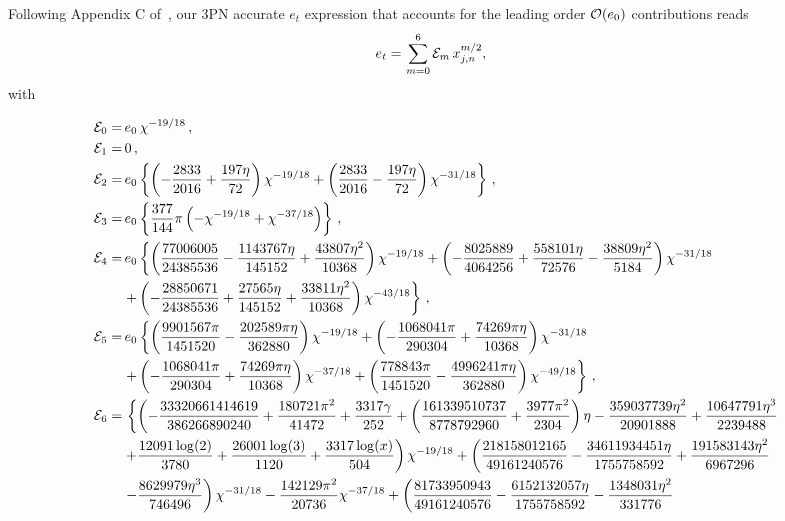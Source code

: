 \documentclass[aps,prd,twocolumn,superscriptaddress,groupedaddress,nofootinbib,showpacs,eqsecnum,useAms]{revtex4-2}
\begin{document}
Following Appendix C of~\cite{TGHH}, our 3PN accurate $e_t$ expression that accounts for the leading order ${\cal O}(e_0)$ contributions reads
\begin{align}
e_t =& \, \sum_{m=0}^{6} {\cal E}_m \, x_{j,n}^{m/2},\label{eq: et}
\end{align}
with 
\begin{widetext}
\begin{subequations}
\begin{align}
{\cal E}_0=& \,e_0\, \chi^{-19/18}\,, \\
{\cal E}_1=& \,0\,, \\
{\cal E}_2=&\, e_0 \left\{\left(-\frac{2833}{2016}+\frac{197 \eta }{72}\right)\chi^{-19/18}+\left(\frac{2833}{2016}-\frac{197\eta}{72}\right)\chi^{-31/18}\right\}\,, \\
{\cal E}_3=& \, e_0\left\{\frac{377}{144}\pi\left(-\chi^{-19/18}+\chi ^{-37/18}\right)\right\}\,, \\
{\cal E}_4=& \,e_0 \left\{\left(\frac{77006005}{24385536}-\frac{1143767 \eta }{145152}+\frac{43807 \eta ^2}{10368}\right)\chi^{-19/18}+\left(-\frac{8025889}{4064256}+\frac{558101\eta }{72576}-\frac{38809 \eta^2}{5184}\right)\chi^{-31/18} \right. \notag \\ &\left. +\left(-\frac{28850671}{24385536}+\frac{27565 \eta }{145152}+\frac{33811 \eta^2}{10368}\right) \chi ^{-43/18}\right\}\,, \\
{\cal E}_5=& \, e_0 \left\{\left(\frac{9901567 \pi }{1451520}-\frac{202589 \pi  \eta }{362880}\right) \chi ^{-19/18}+\left(-\frac{1068041 \pi }{290304}+\frac{74269 \pi  \eta}{10368}\right) \chi ^{-31/18} \right. \notag \\ & \left. +\left(-\frac{1068041 \pi }{290304}+\frac{74269 \pi  \eta }{10368}\right) \chi ^{-37/18} +\left(\frac{778843 \pi}{1451520}-\frac{4996241 \pi  \eta }{362880}\right) \chi ^{-49/18}\right\}\,, \\
{\cal E}_6=& \, \left\{\left(-\frac{33320661414619}{386266890240}+\frac{180721 \pi^2}{41472}+\frac{3317 \gamma }{252}+\left(\frac{161339510737}{8778792960}+\frac{3977 \pi ^2}{2304}\right) \eta -\frac{359037739 \eta^2}{20901888} +\frac{10647791 \eta ^3}{2239488} \right. \right. \notag \\ 
&\left. +\frac{12091 \log (2)}{3780}+\frac{26001 \log (3)}{1120}+\frac{3317 \log (x)}{504}\right)\chi ^{-19/18}+\left(\frac{218158012165}{49161240576}-\frac{34611934451 \eta }{1755758592}+\frac{191583143 \eta ^2}{6967296} \right. \notag \\ 
&\left. -\frac{8629979 \eta ^3}{746496}\right) \chi^{-31/18}-\frac{142129 \pi ^2}{20736}\chi ^{-37/18} +\left(\frac{81733950943}{49161240576}-\frac{6152132057 \eta }{1755758592}-\frac{1348031 \eta^2}{331776} \right. \notag \\ 

\end{align}
\end{subequations}
\end{widetext}
\end{document}
